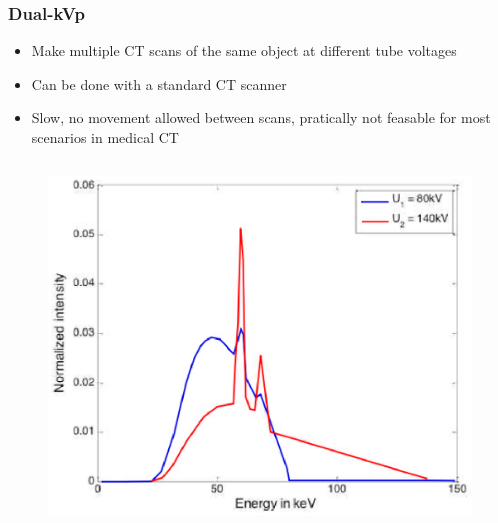 \begin{frame}
    \frametitle{Dual-kVp}
    \vspace{-0.3cm}
    \begin{itemize}
        \item Make multiple CT scans of the same object at different tube voltages
        \item {} Can be done with a standard CT scanner
        \item {} Slow, no movement allowed between scans, pratically not feasable for most scenarios in medical CT
    \end{itemize}
    \begin{columns}[c, onlytextwidth]
        \begin{column}{0.33\textwidth}
            \begin{figure}[]
                \centering
                \includegraphics[width=\textwidth]{images/dual1.eps}

\end{figure}
\end{column}
\end{columns}
\end{frame}
